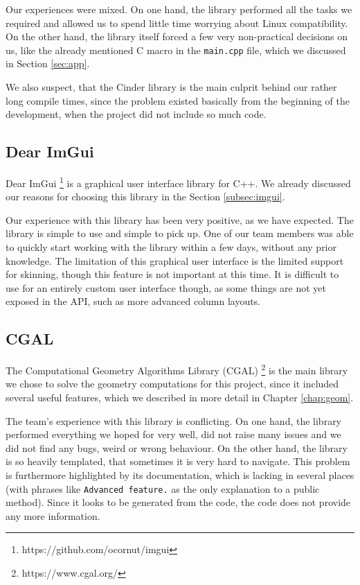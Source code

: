 Our experiences were mixed. On one hand, the library performed all the tasks we required and allowed us to spend little time worrying about Linux compatibility. On the other hand, the library itself forced a few very non-practical decisions on us, like the already mentioned C macro in the \texttt{main.cpp} file, which we discussed in Section \ref{sec:app}.

We also suspect, that the Cinder library is the main culprit behind our rather long compile times, since the problem existed basically from the beginning of the development, when the project did not include so much code.

\subsection{Dear ImGui}

Dear ImGui \footnote{https://github.com/ocornut/imgui} is a graphical user interface library for C++. We already discussed our reasons for choosing this library in the Section \ref{subsec:imgui}.

Our experience with this library has been very positive, as we have expected. The library is simple to use and simple to pick up. One of our team members was able to quickly start working with the library within a few days, without any prior knowledge. The limitation of this graphical user interface is the limited support for skinning, though this feature is not important at this time. It is difficult to use for an entirely custom user interface though, as some things are not yet exposed in the API, such as more advanced column layouts.

\subsection{CGAL}

The Computational Geometry Algorithms Library (CGAL) \footnote{https://www.cgal.org/} is the main library we chose to solve the geometry computations for this project, since it included several useful features, which we described in more detail in Chapter \ref{chap:geom}.

The team's experience with this library is conflicting. On one hand, the library performed everything we hoped for very well, did not raise many issues and we did not find any bugs, weird or wrong behaviour. On the other hand, the library is so heavily templated, that sometimes it is very hard to navigate. This problem is furthermore highlighted by its documentation, which is lacking in several places (with phrases like \texttt{Advanced feature.} as the only explanation to a public method). Since it looks to be generated from the code, the code does not provide any more information.


